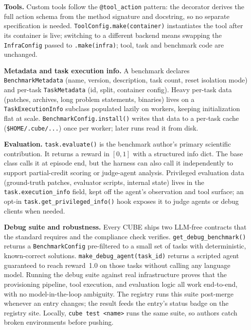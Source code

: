 \documentclass{article}
\newcommand{\mypar}[1]{\par\noindent\textbf{#1}\enspace}
\begin{document}
\mypar{Tools.}
Custom tools follow the \texttt{@tool\_action} pattern: the
decorator derives the full action schema from the method signature and
docstring, so no separate specification is needed.
\texttt{ToolConfig.make(container)} instantiates the tool after its container
is live; switching to a different backend means swapping the \texttt{InfraConfig} passed to \texttt{.make(infra)}; tool, task and benchmark code are unchanged.

\mypar{Metadata and task execution info.}
A benchmark declares \texttt{BenchmarkMetadata} (name, version, description,
task count, reset isolation mode) and per-task \texttt{TaskMetadata} (id, split, container config). Heavy per-task data (patches, archives, long problem statements, binaries) lives on a \texttt{TaskExecutionInfo} subclass populated lazily on workers, keeping initialization flat at scale.
\texttt{BenchmarkConfig.install()} writes that data to a per-task cache (\texttt{\$HOME/.cube/...}) once per worker; later runs read it from disk.

\mypar{Evaluation.}
\texttt{task.evaluate()} is the benchmark author's primary scientific contribution.
It returns a reward in $[0,1]$ with a structured info dict.
The base class calls it at episode end, but the harness can also call it
independently to support partial-credit scoring or judge-agent analysis.
Privileged evaluation data (ground-truth patches, evaluator scripts, internal state) lives in the \texttt{task.execution\_info} field, kept off the agent's observation and tool surface; an opt-in \texttt{task.get\_privileged\_info()} hook exposes it to judge agents or debug clients when needed.

\mypar{Debug suite and robustness.}
Every CUBE ships two LLM-free contracts that the standard requires and the compliance check verifies.
\texttt{get\_debug\_benchmark()} returns a \texttt{BenchmarkConfig} pre-filtered
to a small set of tasks with deterministic, known-correct solutions.
\texttt{make\_debug\_agent(task\_id)} returns a scripted agent guaranteed to reach reward~1.0 on those tasks without calling any language model.
Running the debug suite against real infrastructure proves that the provisioning pipeline, tool execution, and evaluation logic all work end-to-end, with no model-in-the-loop ambiguity.
The registry runs this suite post-merge whenever an entry changes; the result feeds the entry's status badge on the registry site.
Locally, \texttt{cube test <name>} runs the same suite, so authors catch broken environments before pushing.
\end{document}
